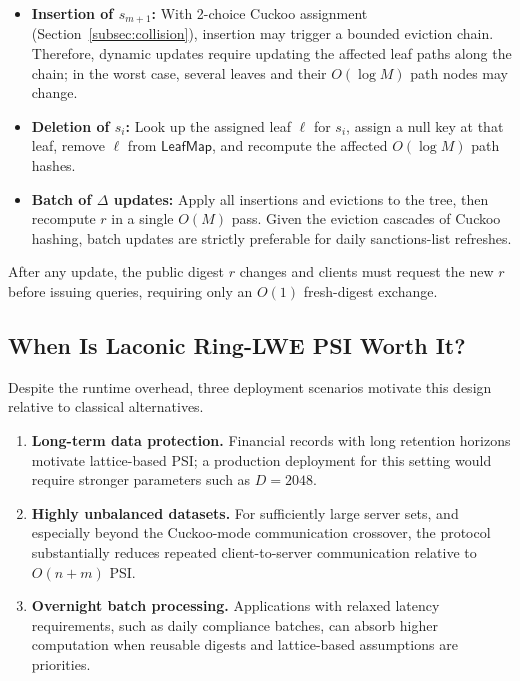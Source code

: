 \documentclass[preprint,12pt]{elsarticle}
\newcommand{\LeafMap}{\mathsf{LeafMap}}
\begin{document}
\begin{itemize}[leftmargin=*]
  \item \textbf{Insertion of $s_{m+1}$:} With 2-choice Cuckoo assignment
        (Section~\ref{subsec:collision}), insertion may trigger a bounded eviction
        chain. Therefore, dynamic updates require updating the affected leaf paths
        along the chain; in the worst case, several leaves and their $O(\log M)$
        path nodes may change.
  \item \textbf{Deletion of $s_i$:} Look up the assigned leaf $\ell$ for
        $s_i$, assign a null key at that leaf, remove $\ell$ from
        $\LeafMap$, and recompute the affected $O(\log M)$ path hashes.
  \item \textbf{Batch of $\Delta$ updates:} Apply all insertions and evictions
        to the tree, then recompute $r$ in a single $O(M)$ pass. Given the
        eviction cascades of Cuckoo hashing, batch updates are strictly
        preferable for daily sanctions-list refreshes.
\end{itemize}

After any update, the public digest $r$ changes and clients must request the
new $r$ before issuing queries, requiring only an $O(1)$ fresh-digest
exchange.

\subsection{When Is Laconic Ring-LWE PSI Worth It?}

Despite the runtime overhead, three deployment scenarios motivate this design
relative to classical alternatives.

\begin{enumerate}[leftmargin=*]
  \item \textbf{Long-term data protection.}
        Financial records with long retention horizons motivate lattice-based PSI; a
        production deployment for this setting would require stronger parameters
        such as $D=2048$.
  \item \textbf{Highly unbalanced datasets.}
        For sufficiently large server sets, and especially beyond the Cuckoo-mode
        communication crossover, the protocol substantially reduces repeated
        client-to-server communication relative to $O(n+m)$ PSI.
  \item \textbf{Overnight batch processing.}
        Applications with relaxed latency requirements, such as daily compliance
        batches, can absorb higher computation when reusable digests and
        lattice-based assumptions are priorities.
\end{enumerate}
\end{document}
